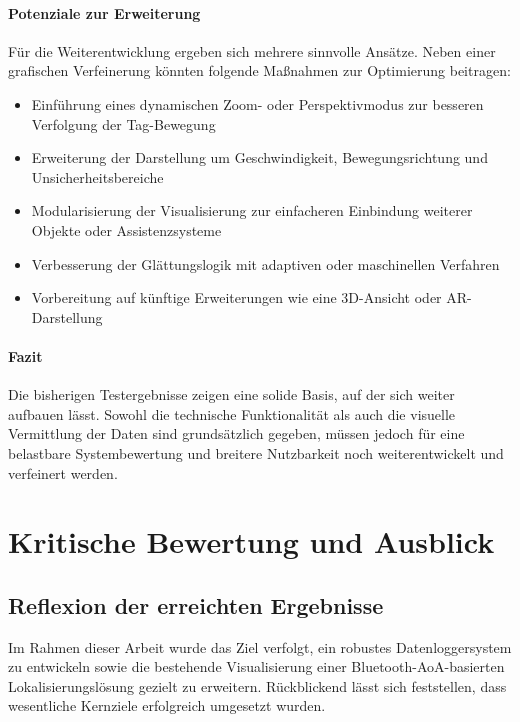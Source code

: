 \documentclass[a4paper, 12pt]{article} %
\begin{document}
\paragraph{Potenziale zur Erweiterung}

Für die Weiterentwicklung ergeben sich mehrere sinnvolle Ansätze. Neben einer grafischen Verfeinerung könnten folgende Maßnahmen zur 
Optimierung beitragen:

\begin{itemize}
    \item Einführung eines dynamischen Zoom- oder Perspektivmodus zur besseren Verfolgung der Tag-Bewegung
    \item Erweiterung der Darstellung um Geschwindigkeit, Bewegungsrichtung und Unsicherheitsbereiche
    \item Modularisierung der Visualisierung zur einfacheren Einbindung weiterer Objekte oder Assistenzsysteme
    \item Verbesserung der Glättungslogik mit adaptiven oder maschinellen Verfahren
    \item Vorbereitung auf künftige Erweiterungen wie eine 3D-Ansicht oder AR-Darstellung
\end{itemize}

\paragraph{Fazit}

Die bisherigen Testergebnisse zeigen eine solide Basis, auf der sich weiter aufbauen lässt. Sowohl die technische Funktionalität als auch die visuelle
 Vermittlung der Daten sind grundsätzlich gegeben, müssen jedoch für eine belastbare Systembewertung und breitere Nutzbarkeit noch weiterentwickelt und 
 verfeinert werden.

 \clearpage

\section{Kritische Bewertung und Ausblick}
\subsection{Reflexion der erreichten Ergebnisse}

Im Rahmen dieser Arbeit wurde das Ziel verfolgt, ein robustes Datenloggersystem zu entwickeln sowie die bestehende Visualisierung einer 
Bluetooth-{AoA}-basierten Lokalisierungslösung gezielt zu erweitern. Rückblickend lässt sich feststellen, dass wesentliche Kernziele erfolgreich 
umgesetzt wurden.
\end{document}
